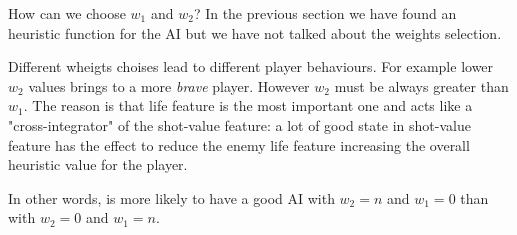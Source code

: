 How can we choose $w_1$ and $w_2$? In the previous section we have found an heuristic
function for the AI but we have not talked about the weights selection.

Different wheigts choises lead to different player behaviours. For example lower $w_2$
values brings to a more \emph{brave} player. However $w_2$ must be always greater than
$w_1$. The reason is that life feature is the most important one and acts like a
"cross-integrator" of the shot-value feature: a lot of good state in shot-value feature
has the effect to reduce the enemy life feature increasing the overall heuristic value for
the player.

In other words, is more likely to have a good AI with $w_2=n$ and $w_1=0$ than with $w_2=0$
and $w_1=n$.
